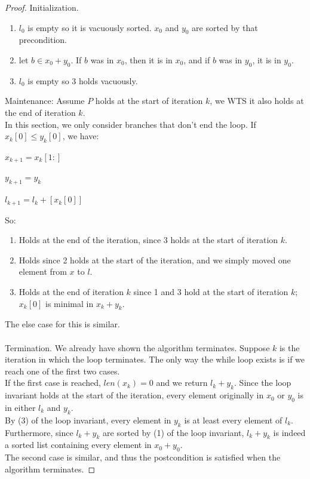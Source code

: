 \documentclass{article}
\begin{document}
\begin{proof}
Initialization.
\begin{enumerate}
    \item $l_0$ is empty so it is vacuously sorted. $x_0$ and $y_0$ are sorted by that precondition.
    \item let $b \in x_0 + y_0$. If $b$ was in $x_0$, then it is in $x_0$, and if $b$ was in $y_0$, it is in $y_0$.
    \item $l_0$ is empty so 3 holds vacuously.
\end{enumerate}
Maintenance: Assume $P$ holds at the start of iteration $k$, we WTS it also holds at the end of iteration $k$.\\
In this section, we only consider branches that don't end the loop. If $x_k[0] \leq y_k[0]$, we have:
\begin{enumerate*}
    \item $x_{k+1} = x_k[1:]$
    \item $y_{k+1} = y_k$
    \item $l_{k+1} = l_k + [x_k[0]]$
\end{enumerate*}
So:
\begin{enumerate}
    \item Holds at the end of the iteration, since 3 holds at the start of iteration $k$.
    \item Holds since 2 holds at the start of the iteration, and we simply moved one element from $x$ to $l$.
    \item Holds at the end of iteration $k$ since 1 and 3 hold at the start of iteration $k$; $x_k[0]$ is minimal in $x_k + y_k$.
\end{enumerate}
The else case for this is similar.\\
\\
Termination. We already have shown the algorithm terminates. Suppose $k$ is the iteration in which the loop terminates. The only way the while loop exists is if we reach one of the first two cases.\\
If the first case is reached, $len(x_k) = 0$ and we return $l_k + y_k$. Since the loop invariant holds at the start of the iteration, every element originally in $x_0$ or $y_0$ is in either $l_k$ and $y_k$.\\
By (3) of the loop invariant, every element in $y_k$ is at least every element of $l_k$. Furthermore, since $l_k + y_k$ are sorted by (1) of the loop invariant, $l_k + y_k$ is indeed a sorted list containing every element in $x_0 + y_0$.\\
The second case is similar, and thus the postcondition is satisfied when the algorithm terminates.
\end{proof}
\end{document}
